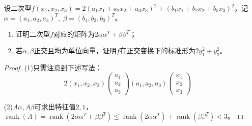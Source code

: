 \begin{theorem}
	设二次型$f(x_1,x_2,x_3)=2(a_1x_1+a_2x_2+a_3x_3)^2+(b_1x_1+b_2x_2+b_3x_3)^2$，记$\alpha=(a_1,a_2,a_3)^T,\;\beta=(b_1,b_2,b_3)^T$。
	\begin{enumerate}
		\item 证明二次型$f$对应的矩阵为$2\alpha\alpha^T+\beta\beta^T$；
		\item 若$\alpha,\beta$正交且均为单位向量，证明$f$在正交变换下的标准形为$2y_1^2+y_2^2$。
	\end{enumerate}
\end{theorem}
\begin{proof}
	(1)只需注意到下述写法：
	\begin{equation*}
		2(x_1,x_2,x_3)
		\begin{pmatrix}
			a_1 \\
			a_2 \\
			a_3
		\end{pmatrix}
		(a_1,a_2,a_3)
		\begin{pmatrix}
			x_1 \\
			x_2 \\
			x_3
		\end{pmatrix}
	\end{equation*}\par
	(2)$A\alpha,A\beta$可求出特征值$2,1$，$\operatorname{rank}(A)=\operatorname{rank}(2\alpha\alpha^T+\beta\beta^T)\leqslant\operatorname{rank}(2\alpha\alpha^T)+\operatorname{rank}(\beta\beta^T)<3$。
\end{proof}













